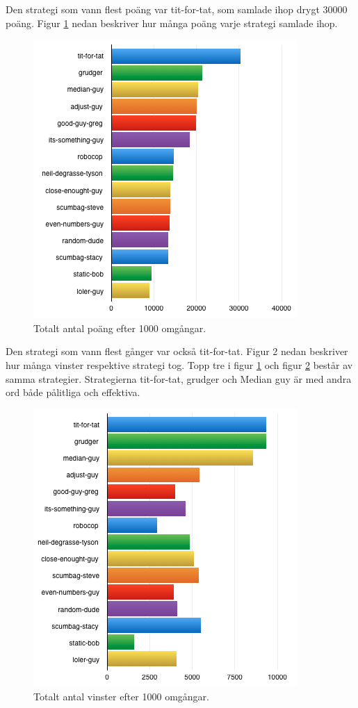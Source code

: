 Den strategi som vann flest poäng var tit-for-tat, som samlade ihop drygt 30000 poäng. Figur \ref{points} nedan beskriver hur många poäng varje strategi samlade ihop. 
\begin{figure}[htb]
	\begin{center}
	\includegraphics[scale=0.75, angle=0]{bilder/points.png}
	\caption{Totalt antal poäng efter 1000 omgångar.}
	\label{points}
	\end{center}
\end{figure}

Den strategi som vann flest gånger var också tit-for-tat. Figur 2 nedan beskriver hur många vinster respektive strategi tog. Topp tre i figur \ref{points} och figur \ref{wins} består av samma strategier. Strategierna tit-for-tat, grudger och Median guy är med andra ord både pålitliga och effektiva. 
\begin{figure}[htb]
	\begin{center}
	\includegraphics[scale=0.75, angle=0]{bilder/wins.png}
	\caption{Totalt antal vinster efter 1000 omgångar.}
	\label{wins}
	\end{center}
\end{figure}

